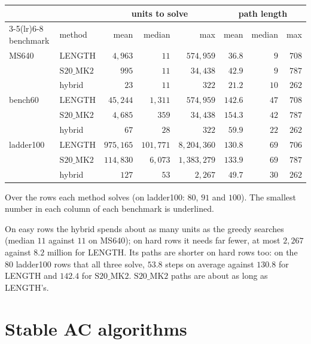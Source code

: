 \documentclass[11pt]{article}
\theoremstyle{definition}
\theoremstyle{remark}
\newcommand{\SMK}{\mathrm{S20\_MK2}}
\begin{document}
\begin{center}
\small
\begin{tabular}{llrrrrrr}
\toprule
& & \multicolumn{3}{c}{units to solve} & \multicolumn{3}{c}{path length}\\
\cmidrule(lr){3-5}\cmidrule(lr){6-8}
benchmark & method & mean & median & max & mean & median & max\\
\midrule
MS640 & LENGTH & $4{,}963$ & $11$ & $574{,}959$ & $36.8$ & \underline{$9$} & $708$\\
 & $\SMK$ & $995$ & $11$ & $34{,}438$ & $42.9$ & \underline{$9$} & $787$\\
 & hybrid & \underline{$23$} & $11$ & \underline{$322$} & \underline{$21.2$} & $10$ & \underline{$262$}\\
\midrule
bench60 & LENGTH & $45{,}244$ & $1{,}311$ & $574{,}959$ & $142.6$ & $47$ & $708$\\
 & $\SMK$ & $4{,}685$ & $359$ & $34{,}438$ & $154.3$ & $42$ & $787$\\
 & hybrid & \underline{$67$} & \underline{$28$} & \underline{$322$} & \underline{$59.9$} & \underline{$22$} & \underline{$262$}\\
\midrule
ladder100 & LENGTH & $975{,}165$ & $101{,}771$ & $8{,}204{,}360$ & $130.8$ & $69$ & $706$\\
 & $\SMK$ & $114{,}830$ & $6{,}073$ & $1{,}383{,}279$ & $133.9$ & $69$ & $787$\\
 & hybrid & \underline{$127$} & \underline{$53$} & \underline{$2{,}267$} & \underline{$49.7$} & \underline{$30$} & \underline{$262$}\\
\bottomrule
\end{tabular}
 
\smallskip
\footnotesize Over the rows each method solves (on ladder100: $80$, $91$ and $100$). The smallest number in each
column of each benchmark is underlined.
\end{center}
 
 
On easy rows the hybrid spends about as many units as the greedy searches (median $11$ against $11$ on MS640); on
hard rows it needs far fewer, at most $2{,}267$ against $8.2$ million for LENGTH.
Its paths are shorter on hard rows too: on the $80$ ladder100 rows that all three solve, $53.8$ steps on average
against $130.8$ for LENGTH and $142.4$ for $\SMK$. $\SMK$ paths are about as long as LENGTH's.

\clearpage
\section{Stable AC algorithms}\label{sec:stable}
\end{document}
